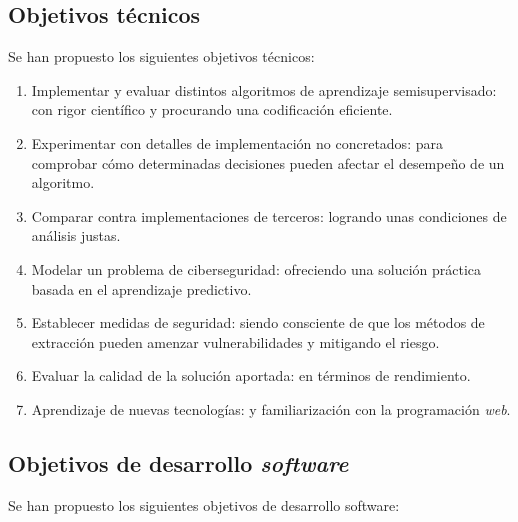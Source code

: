 \subsection{Objetivos técnicos}
\label{Objetivos técnicos}

Se han propuesto los siguientes objetivos técnicos:

\begin{enumerate}
	\item Implementar y evaluar distintos algoritmos de aprendizaje semisupervisado: con rigor científico y procurando una codificación eficiente.
	\item Experimentar con detalles de implementación no concretados: para comprobar cómo determinadas decisiones pueden afectar el desempeño de un algoritmo.
	\item Comparar contra implementaciones de terceros: logrando unas condiciones de análisis justas.
	\item Modelar un problema de ciberseguridad: ofreciendo una solución práctica basada en el aprendizaje predictivo.
	\item Establecer medidas de seguridad: siendo consciente de que los métodos de extracción pueden amenzar vulnerabilidades y mitigando el riesgo.
	\item Evaluar la calidad de la solución aportada: en términos de rendimiento.
	\item Aprendizaje de nuevas tecnologías: y familiarización con la programación \textit{web}.
	
\end{enumerate}

\subsection{Objetivos de desarrollo \textit{software}}
\label{Objetivos de desarrollo}

Se han propuesto los siguientes objetivos de desarrollo software:

